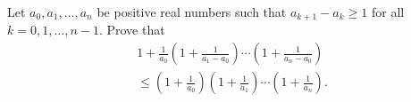 \documentclass{article}
\begin{document}
\setlength{\parindent}{0pt}
Let $a_{0},a_{1},\dots,a_{n}$ be positive real numbers such that $a_{k+1}-a_{k}\ge1$ for all $k=0,1,\dots,n-1$. Prove that
\begin{multline*}
1+\frac{1}{a_{0}}\left(1+\frac{1}{a_{1}-a_{0}}\right)\cdots\left(1+\frac{1}{a_{n}-a_{0}}\right)\\\le\left(1+\frac{1}{a_{0}}\right)\left(1+\frac{1}{a_{1}}\right)\cdots\left(1+\frac{1}{a_{n}}\right).
\end{multline*}
\end{document}

